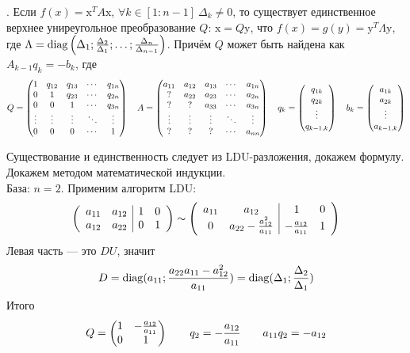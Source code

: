 \documentclass{article}
\begin{document}
\begin{itemize}
\begin{Comment}
        \end{Comment}
        \thm {}. Если $f(x)=\mathrm x^TA\mathrm x$, $\forall k\in[1:n-1]~\Delta_k\neq0$, то существует единственное верхнее униреугольное преобразование $Q$: $\mathrm x=Q\mathrm y$, что $f(x)=g(y)=\mathrm y^T\Lambda\mathrm y$, где $\Lambda=\diag\left(\Delta_1;\frac{\Delta_2}{\Delta_1};\ldots;\frac{\Delta_n}{\Delta_{n-1}}\right)$. Причём $Q$ может быть найдена как $A_{k-1}q_k=-b_k$, где
        $$
        Q=\matr{
            1 & q_{12} & q_{13} & \cdots & q_{1n}\\
            0 & 1 & q_{23} & \cdots & q_{2n}\\
            0 & 0 & 1 & \cdots & q_{3n}\\
            \vdots & \vdots & \vdots & \ddots & \vdots\\
            0 & 0 & 0 & \cdots & 1\\
        }\quad
        A=\matr{
            a_{11} & a_{12} & a_{13} & \cdots & a_{1n}\\
            ? & a_{22} & a_{23} & \cdots & a_{2n}\\
            ? & ? & a_{33} & \cdots & a_{3n}\\
            \vdots & \vdots & \vdots & \ddots & \vdots\\
            ? & ? & ? & \cdots & a_{nn}\\
        }\quad
        q_k=\matr{q_{1k}\\q_{2k}\\\vdots\\q_{k-1,k}}\quad
        b_k=\matr{a_{1k}\\a_{2k}\\\vdots\\a_{k-1,k}}
        $$
        \begin{Proof}
            Существование и единственность следует из LDU-разложения, докажем формулу. Докажем методом математической индукции.\\
            База: $n=2$. Применим алгоритм LDU:
            $$
            \arr{cc|cc}{a_{11} & a_{12} & 1 & 0\\a_{12} & a_{22} & 0 & 1}\sim
            \arr{cc|cc}{a_{11} & a_{12} & 1 & 0\\0 & a_{22}-\frac{a_{12}^2}{a_{11}} & -\frac{a_{12}}{a_{11}} & 1}
            $$
            Левая часть --- это $DU$, значит $$D=\diag(a_{11};\frac{a_{22}a_{11}-a_{12}^2}{a_{11}})=\diag(\Delta_1;\frac{\Delta_2}{\Delta_1})$$
            Итого
            $$
            Q=\matr{1 & -\frac{a_{12}}{a_{11}}\\0&1}\qquad q_2=-\frac{a_{12}}{a_{11}}\qquad a_{11}q_2=-a_{12}
$$
\end{Proof}
\end{itemize}
\end{document}
